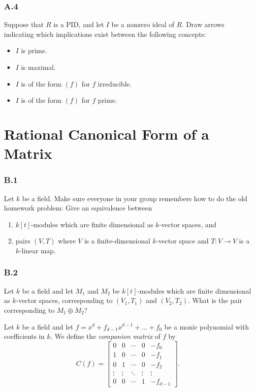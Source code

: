 \documentclass[lang=cn,11pt]{template}
\begin{document}
\subsection*{A.4} Suppose that \( R \) is a PID, and let \( I \) be a nonzero ideal of \( R \). Draw arrows indicating which implications exist between the following concepts:
\begin{itemize}
    \item \( I \) is prime.
    \item \( I \) is maximal.
    \item \( I \) is of the form \( (f) \) for \( f \) irreducible.
    \item \( I \) is of the form \( (f) \) for \( f \) prime.
\end{itemize}









\chapter{Rational Canonical Form of a Matrix}

\subsection*{B.1} Let \( k \) be a field. Make sure everyone in your group remembers how to do the old homework problem: Give an equivalence between
\begin{enumerate}
    \item \( k[t] \)-modules which are finite dimensional as \( k \)-vector spaces, and
    \item pairs \( (V, T) \) where \( V \) is a finite-dimensional \( k \)-vector space and \( T : V \to V \) is a \( k \)-linear map.
\end{enumerate}

\subsection*{B.2} Let \( k \) be a field and let \( M_1 \) and \( M_2 \) be \( k[t] \)-modules which are finite dimensional as \( k \)-vector spaces, corresponding to \( (V_1, T_1) \) and \( (V_2, T_2) \). What is the pair corresponding to \( M_1 \oplus M_2 \)?

\begin{definition}
Let \( k \) be a field and let \( f = x^d + f_{d-1} x^{d-1} + \dots + f_0 \) be a monic polynomial with coefficients in \( k \). We define the \textit{companion matrix} of \( f \) by
\[
C(f) = \begin{bmatrix}
0 & 0 & \cdots & 0 & -f_0 \\
1 & 0 & \cdots & 0 & -f_1 \\
0 & 1 & \cdots & 0 & -f_2 \\
\vdots & \vdots & \ddots & \vdots & \vdots \\
0 & 0 & \cdots & 1 & -f_{d-1}
\end{bmatrix}.
\]
\end{definition}
\end{document}
